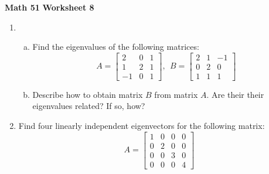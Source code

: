 \documentclass[10pt]{article}
\begin{document}
\noindent
{\large {\bf Math 51}   \hspace{13em}  {\bf Worksheet 8} \hspace{11em}   \hspace{2em}   


\begin{enumerate}
\item 
\begin{enumerate}[(a)]
\item Find the eigenvalues of the following matrices:
\begin{equation*}
A = \begin{bmatrix}
2 & 0 & 1\\
1 & 2 & 1\\
-1 & 0 & 1
\end{bmatrix},~~
B = \begin{bmatrix}
2&1&-1\\
0&2&0\\
1&1&1
\end{bmatrix}
\end{equation*}
\vfil
\item Describe how to obtain matrix \(B\) from matrix \(A\). Are their
  their eigenvalues related? If so, how?
\end{enumerate}

\vfil

\item Find four linearly independent  eigenvectors for the following matrix:
\begin{equation*}
A = \begin{bmatrix}
1&0&0&0\\
0&2&0&0\\
0&0&3&0\\
0&0&0&4
\end{bmatrix}
\end{equation*}

\vfil
\newpage


\end{enumerate}}
\end{document}
